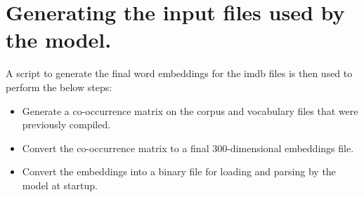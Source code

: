 \chapter{Generating the input files used by the model.}
\label{chp:appendix_a}


A script to generate the final word embeddings for the \gls{imdb} files is then used to perform the below steps:
\begin{itemize}
    \item Generate a co-occurrence matrix on the \gls{corpus} and vocabulary files that were previously compiled.
    \item Convert the co-occurrence matrix to a final 300-dimensional embeddings file.
    \item Convert the embeddings into a binary file for loading and parsing by the model at startup.
\end{itemize}
